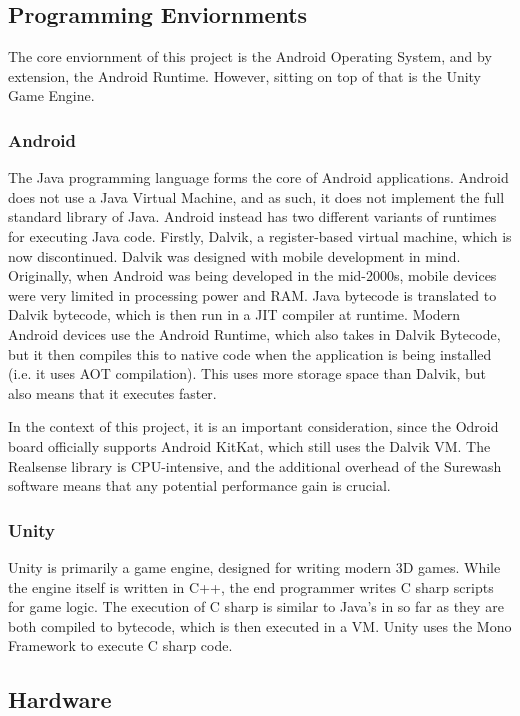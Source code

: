     \subsection{Programming Enviornments}
    The core enviornment of this project is the Android Operating System, and by extension, the Android Runtime. However, sitting on top of that is the Unity Game Engine.
        \subsubsection{Android}
        The Java programming language forms the core of Android applications. Android does not use a Java Virtual Machine, and as such, it does not implement the full standard library of Java. Android instead has two different variants of runtimes for executing Java code. Firstly, Dalvik, a register-based virtual machine, which is now discontinued. Dalvik was designed with mobile development in mind. Originally, when Android was being developed in the mid-2000s, mobile devices were very limited in processing power and RAM. Java bytecode is translated to Dalvik bytecode, which is then run in a JIT compiler at runtime. Modern Android devices use the Android Runtime, which also takes in Dalvik Bytecode, but it then compiles this to native code when the application is being installed (i.e. it uses AOT compilation). This uses more storage space than Dalvik, but also means that it executes faster.

        In the context of this project, it is an important consideration, since the Odroid board officially supports Android KitKat, which still uses the Dalvik VM. The Realsense library is CPU-intensive, and the additional overhead of the Surewash software means that any potential performance gain is crucial.
        \subsubsection{Unity}
        Unity is primarily a game engine, designed for writing modern 3D games. While the engine itself is written in C++, the end programmer writes C sharp scripts for game logic. The execution of C sharp is similar to Java's in so far as they are both compiled to bytecode, which is then executed in a VM. Unity uses the Mono Framework to execute C sharp code.
    
    \subsection{Hardware}
